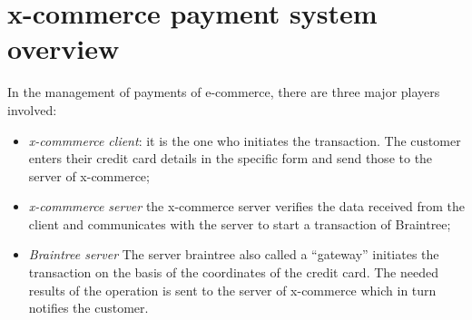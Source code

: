 \section{x-commerce payment system overview}
\label{sec:payment_system_overview}
In the management of payments of e-commerce, there are three major players involved:
\begin{itemize}
\item \emph{x-commmerce client}: it is the one who initiates the transaction. The customer enters their credit card details in the specific form and send those to the server of x-commerce;
\item \emph{x-commmerce server} the x-commerce server verifies the data received from the client and communicates with the server to start a transaction of Braintree;
\item \emph{Braintree server} The server braintree also called a “gateway” initiates the transaction on the basis of the coordinates of the credit card.
The needed results of the operation is sent to the server of x-commerce which in turn notifies the customer.
\end{itemize}
